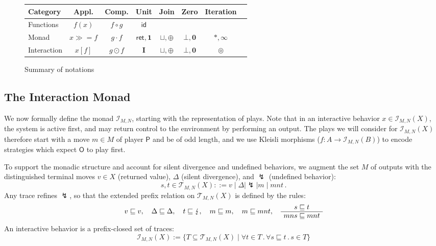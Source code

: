 \documentclass[acmsmall,timestamp,review,anonymous]{acmart}
\newcommand{\kw}[1]{\ensuremath{ \mathsf{#1} }}
\newcommand{\bind}{\gg\!\!=}
\begin{document}

\begin{figure} %
  \begin{center}
    \begin{tabular}{lccccccc}
      \hline
      Category & Appl. & Comp. & Unit & Join & Zero & Iteration \\
      \hline
      Functions & $f(x)$ & $f \circ g$ & \kw{id} & & \\
      Monad &
        $x \bind f$ & $g \cdot f$ & $\kw{ret}, \mathbf{1}$ &
        ${\sqcup}, {\oplus}$ & $\bot, \mathbf{0}$ & ${*}, {\infty}$ \\
      Interaction &
        $x[f]$ & $g \odot f$ & $\mathbf{I}$ &
        ${\sqcup}, {\oplus}$ & $\bot, \mathbf{0}$ & $\circledcirc$ \\
      \hline
    \end{tabular}
  \end{center}
  \caption{Summary of notations}
  \label{fig:notations}
\end{figure}



\subsection{The Interaction Monad} \label{sec:monad:def} %

We now formally define the monad $\mathcal{I}_{M,N}$,
starting with the representation of plays. 
Note that
in an interactive behavior
$x \in \mathcal{I}_{M,N}(X)$,
the system is active first,
and may return control to the environment
by performing an output.
The plays we will consider for $\mathcal{I}_{M,N}(X)$
therefore start with a move $m \in M$ of player $\kw{P}$
and be of odd length,
and we use Kleisli morphisms
($f : A \rightarrow \mathcal{I}_{M,N}(B)$)
to encode strategies
which expect $\kw{O}$ to play first.

To support the monadic structure and account
for silent divergence and undefined behaviors,
we augment the set $M$ of outputs with the
distinguished terminal moves
$v \in X$ (returned value),
$\Delta$ (silent divergence), and
$\lightning$ (undefined behavior):
\[
    s, t \in
    \mathcal{T}_{M,N}(X) ::=
    v \mid \Delta \mid \lightning \mid m \mid mnt \,.
\]
Any trace refines $\lightning$, so that
the extended prefix relation on $\mathcal{T}_{M,N}(X)$
is defined by the rules:
\begin{gather*}
  v \sqsubseteq v , \quad
  \Delta \sqsubseteq \Delta , \quad
  t \sqsubseteq \lightning , \quad
  m \sqsubseteq m , \quad
  m \sqsubseteq mnt ,
  \quad
  \AxiomC{$s \sqsubseteq t$}
  \UnaryInfC{$mns \sqsubseteq mnt$}
  \DisplayProof
\end{gather*}
An interactive behavior is
a prefix-closed set of traces:
\[
    \mathcal{I}_{M,N}(X) :=
    \{ T \subseteq \mathcal{T}_{M,N}(X) \mid
       \forall t \in T \,.\, \forall s \sqsubseteq t \,.\, s \in T \}
\]
\end{document}

